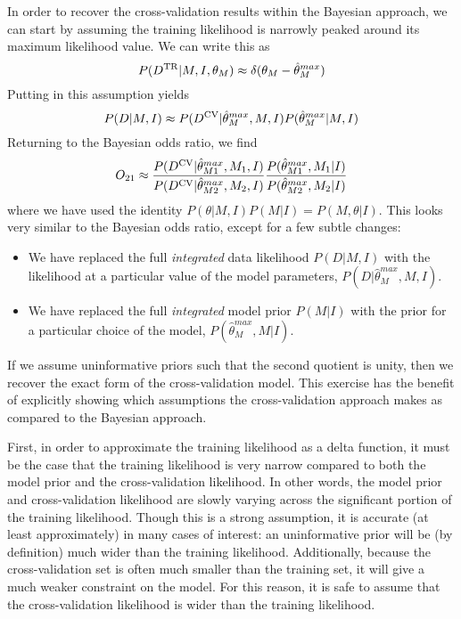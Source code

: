 \documentclass[12pt]{article}
\newcommand{\Dtr}{\ensuremath{D^{\rm TR}}}
\newcommand{\Dcv}{\ensuremath{D^{\rm CV}}}
\begin{document}
In order to recover the cross-validation results within the Bayesian approach,
we can start by assuming the training likelihood is narrowly peaked around its
maximum likelihood value.  We can write this as
\begin{equation}
  P(\Dtr|M, I, \theta_M) \approx \delta(\theta_M - \hat{\theta}^{max}_M)
\end{equation}
Putting in this assumption yields
\begin{equation}
  P(D|M,I) \approx P(\Dcv|\hat{\theta}^{max}_M,M,I)P(\hat{\theta}^{max}_M|M,I)
\end{equation}
Returning to the Bayesian odds ratio, we find
\begin{equation}
  O_{21} \approx \frac{P(\Dcv|\hat{\theta}^{max}_{M1},M_1,I)}
                     {P(\Dcv|\hat{\theta}^{max}_{M2},M_2,I)}
                \frac{P(\hat{\theta}^{max}_{M1},M_1|I)}
                     {P(\hat{\theta}^{max}_{M2},M_2|I)}
\end{equation}
where we have used the identity $P(\theta|M,I)P(M|I) = P(M,\theta|I)$.
This looks very similar to the Bayesian odds ratio, except for a few
subtle changes:
\begin{itemize}
  \item We have replaced the full {\it integrated} data likelihood
    $P(D|M,I)$ with the likelihood at a particular value of the model
    parameters, $P(D|\hat{\theta}^{max}_{M},M,I)$.
  \item We have replaced the full {\it integrated} model prior $P(M|I)$
    with the prior for a particular choice of the model,
    $P(\hat{\theta}^{max}_{M},M|I)$.
\end{itemize}
If we assume uninformative priors such that the second quotient is unity,
then we recover the exact form of the cross-validation model.
This exercise has the benefit of explicitly showing which assumptions the
cross-validation approach makes as compared to the Bayesian approach.

First, in order to approximate the training likelihood as a delta function,
it must be the case that the training likelihood is very narrow compared to
both the model prior and the cross-validation likelihood.  In other words,
the model prior and cross-validation likelihood are slowly varying across
the significant portion of the training likelihood.  Though this is a strong
assumption, it is accurate (at least approximately) in many cases of interest:
an uninformative prior will be (by definition) much wider than the training
likelihood.  Additionally, because the cross-validation set is often much
smaller than the training set, it will give a much weaker constraint on the
model.  For this reason, it is safe to assume that the cross-validation
likelihood is wider than the training likelihood.
\end{document}
